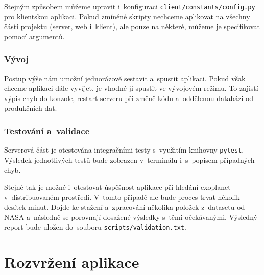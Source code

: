 \documentclass[a4paper,12pt]{article}
\def\code#1{\texttt{#1}}
\begin{document}
{{{{{{{{{{{

Stejným způsobem můžeme upravit i~konfiguraci \code{client/constants/config.py} pro klientskou aplikaci. Pokud zmíněné skripty nechceme aplikovat na všechny části projektu (server, web i~klient), ale pouze na některé, můžeme je specifikovat pomocí argumentů.



\vspace{-10pt}

\subsubsection{Vývoj}

Postup výše nám umožní jednorázově sestavit a~spustit aplikaci. Pokud však chceme aplikaci dále vyvíjet, je vhodné ji spustit ve vývojovém režimu. To zajistí výpis chyb do konzole, restart serveru při změně kódu a~oddělenou databázi od produkčních dat.



\vspace{-20pt}

\subsubsection{Testování a~validace}

Serverová část je otestována integračními testy s~využitím knihovny \code{pytest}. Výsledek jednotlivých testů bude zobrazen v~terminálu i~s~popisem případných chyb.



Stejně tak je možné i~otestovat úspěšnost aplikace při hledání exoplanet v~distribuovaném prostředí. V~tomto případě ale bude proces trvat několik desítek minut. Dojde ke stažení a~zpracování několika položek z~datasetu od NASA a~následně se porovnají dosažené výsledky s~těmi očekávanými. Výsledný report bude uložen do~souboru \code{scripts/validation.txt}.



\section{Rozvržení aplikace}

}}}}}}}}}}}
\end{document}
